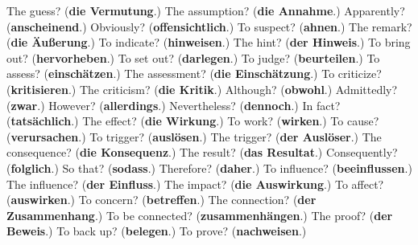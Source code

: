 \begin{tcolorbox}[breakable,colback=teal!4,colframe=teal!35!black,title={Before you move on}]
The guess? (\textbf{die Vermutung}.) The assumption? (\textbf{die Annahme}.) Apparently? (\textbf{anscheinend}.) Obviously? (\textbf{offensichtlich}.) To suspect? (\textbf{ahnen}.) The remark? (\textbf{die Äußerung}.) To indicate? (\textbf{hinweisen}.) The hint? (\textbf{der Hinweis}.) To bring out? (\textbf{hervorheben}.) To set out? (\textbf{darlegen}.) To judge? (\textbf{beurteilen}.) To assess? (\textbf{einschätzen}.) The assessment? (\textbf{die Einschätzung}.) To criticize? (\textbf{kritisieren}.) The criticism? (\textbf{die Kritik}.) Although? (\textbf{obwohl}.) Admittedly? (\textbf{zwar}.) However? (\textbf{allerdings}.) Nevertheless? (\textbf{dennoch}.) In fact? (\textbf{tatsächlich}.) The effect? (\textbf{die Wirkung}.) To work? (\textbf{wirken}.) To cause? (\textbf{verursachen}.) To trigger? (\textbf{auslösen}.) The trigger? (\textbf{der Auslöser}.) The consequence? (\textbf{die Konsequenz}.) The result? (\textbf{das Resultat}.) Consequently? (\textbf{folglich}.) So that? (\textbf{sodass}.) Therefore? (\textbf{daher}.) To influence? (\textbf{beeinflussen}.) The influence? (\textbf{der Einfluss}.) The impact? (\textbf{die Auswirkung}.) To affect? (\textbf{auswirken}.) To concern? (\textbf{betreffen}.) The connection? (\textbf{der Zusammenhang}.) To be connected? (\textbf{zusammenhängen}.) The proof? (\textbf{der Beweis}.) To back up? (\textbf{belegen}.) To prove? (\textbf{nachweisen}.)
\end{tcolorbox}
